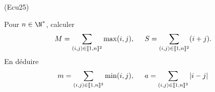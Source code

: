 \begin{tiny}(Ecu25)\end{tiny} Pour $n\in \N^*$, calculer
\begin{multline*}
 M = \sum_{(i,j)\in \llbracket 1, n\rrbracket^2}\max(i,j),\hspace{0.5cm}
 S = \sum_{(i,j)\in \llbracket 1, n\rrbracket^2}(i+j).
\end{multline*}
En déduire
\begin{displaymath}
 m = \sum_{(i,j)\in \llbracket 1, n\rrbracket^2}\min(i,j),\hspace{0.5cm} 
 a = \sum_{(i,j)\in \llbracket 1, n\rrbracket^2}|i - j|
\end{displaymath}
